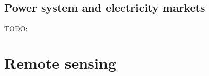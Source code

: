 \clearpage
\subsection{Power system and electricity markets}
\label{sec:intro_power_markets}

TODO:

\clearpage
\section{Remote sensing}
\label{intro_remote_sensing}

